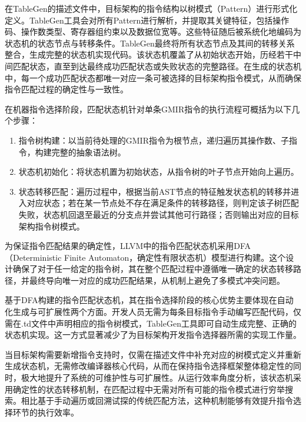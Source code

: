 在TableGen的描述文件中，目标架构的指令结构以树模式（Pattern）进行形式化定义。TableGen工具会对所有Pattern进行解析，并提取其关键特征，包括操作码、操作数类型、寄存器组约束以及数据位宽等。这些特征随后被系统化地编码为状态机的状态节点与转移条件。TableGen最终将所有状态节点及其间的转移关系整合，生成完整的状态机实现代码。该状态机覆盖了从初始状态开始，历经若干中间匹配状态，直至到达最终成功匹配状态或失败状态的完整路径。在生成的状态机中，每一个成功匹配状态都唯一对应一条可被选择的目标架构指令模式，从而确保指令匹配过程的确定性与一致性。

\par

在机器指令选择阶段，匹配状态机针对单条GMIR指令的执行流程可概括为以下几个步骤：

\begin{enumerate}
	\item
	指令树构建：以当前待处理的GMIR指令为根节点，递归遍历其操作数、子指令，构建完整的抽象语法树。
	
	\item
	状态机初始化：将状态机置为初始状态，从指令树的叶子节点开始向上遍历。
	
	\item 
	状态转移匹配：遍历过程中，根据当前AST节点的特征触发状态机的转移并进入对应状态；若在某一节点处不存在满足条件的转移路径，则判定该子树匹配失败，状态机回退至最近的分支点并尝试其他可行路径；否则输出对应的目标架构指令树模式。
	
\end{enumerate}

为保证指令匹配结果的确定性，LLVM中的指令匹配状态机采用DFA（Deterministic Finite Automaton，确定性有限状态机）模型进行构建。这个设计确保了对于任一给定的指令树，其在整个匹配过程中遵循唯一确定的状态转移路径，并最终导向唯一对应的成功匹配结果，从机制上避免了多模式冲突问题。

\par

基于DFA构建的指令匹配状态机，其在指令选择阶段的核心优势主要体现在自动化生成与可扩展性两个方面。开发人员无需为每条目标指令手动编写匹配代码，仅需在.td文件中声明相应的指令树模式，TableGen工具即可自动生成完整、正确的状态机实现。这一方式显著减少了为目标架构开发指令选择器所需的实现工作量。

\par

当目标架构需要新增指令支持时，仅需在描述文件中补充对应的树模式定义并重新生成状态机，无需修改编译器核心代码，从而在保持指令选择框架整体稳定性的同时，极大地提升了系统的可维护性与可扩展性。从运行效率角度分析，该状态机采用确定性的状态转移机制，在匹配过程中无需对所有可能的指令模式进行穷举搜索。相比基于手动遍历或回溯试探的传统匹配方法，这种机制能够有效提升指令选择环节的执行效率。


